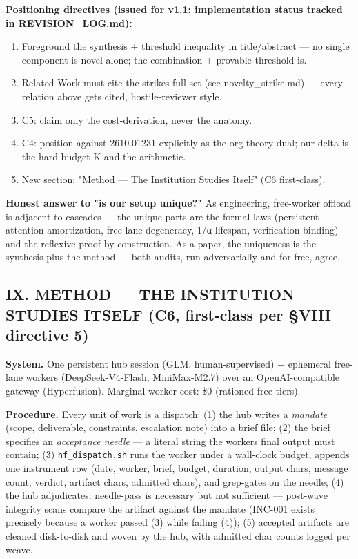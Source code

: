 \documentclass[
]{article}
\providecommand{\tightlist}{%
  \setlength{\itemsep}{0pt}\setlength{\parskip}{0pt}}
\begin{document}
\textbf{Positioning directives (issued for v1.1; implementation status
tracked in REVISION\_LOG.md):}

\begin{enumerate}
\def\labelenumi{\arabic{enumi}.}
\tightlist
\item
  Foreground the synthesis + threshold inequality in title/abstract ---
  no single component is novel alone; the combination + provable
  threshold is.
\item
  Related Work must cite the strike\textquotesingle s full set (see
  novelty\_strike.md) --- every relation above gets cited,
  hostile-reviewer style.
\item
  C5: claim only the cost-derivation, never the anatomy.
\item
  C4: position against 2610.01231 explicitly as the org-theory dual; our
  delta is the hard budget K and the arithmetic.
\item
  New section: "Method --- The Institution Studies Itself" (C6
  first-class).
\end{enumerate}

\textbf{Honest answer to "is our setup unique?"} As engineering,
free-worker offload is adjacent to cascades --- the unique parts are the
formal laws (persistent attention amortization, free-lane degeneracy,
1/α lifespan, verification binding) and the reflexive
proof-by-construction. As a paper, the uniqueness is the synthesis plus
the method --- both audits, run adversarially and for free, agree.

\subsection{IX. METHOD --- THE INSTITUTION STUDIES ITSELF (C6,
first-class per §VIII directive
5)}\label{ix-method--the-institution-studies-itself-c6-first-class-per-viii-directive-5}

\textbf{System.} One persistent hub session (GLM, human-supervised) +
ephemeral free-lane workers (DeepSeek-V4-Flash, MiniMax-M2.7) over an
OpenAI-compatible gateway (Hyperfusion). Marginal worker cost: \$0
(rationed free tiers).

\textbf{Procedure.} Every unit of work is a dispatch: (1) the hub writes
a \emph{mandate} (scope, deliverable, constraints, escalation note) into
a brief file; (2) the brief specifies an \emph{acceptance needle} --- a
literal string the worker\textquotesingle s final output must contain;
(3) \texttt{hf\_dispatch.sh} runs the worker under a wall-clock budget,
appends one instrument row (date, worker, brief, budget, duration,
output chars, message count, verdict, artifact chars, admitted chars),
and grep-gates on the needle; (4) the hub adjudicates: needle-pass is
necessary but not sufficient --- post-wave integrity scans compare the
artifact against the mandate (INC-001 exists precisely because a worker
passed (3) while failing (4)); (5) accepted artifacts are cleaned
disk-to-disk and woven by the hub, with admitted char counts logged per
weave.
\end{document}
